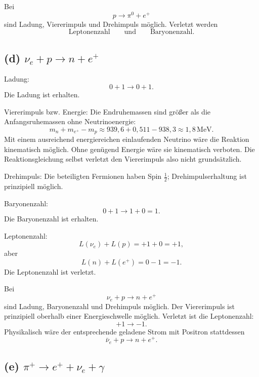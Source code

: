 \documentclass[11pt,a4paper]{scrartcl}
\begin{document}
\begin{answerbox}
Bei
\[
p\to\pi^0+e^+
\]
sind Ladung, Viererimpuls und Drehimpuls möglich. Verletzt werden
\[
\boxed{\text{Leptonenzahl}}
\qquad\text{und}\qquad
\boxed{\text{Baryonenzahl}}.
\]
\end{answerbox}

\subsection*{(d) $\nu_e+p\to n+e^+$}

\begin{calculationbox}
Ladung:
\[
0+1\to0+1.
\]
Die Ladung ist erhalten.

\begin{calculationbox}
Viererimpuls bzw. Energie: Die Endruhemassen sind größer als die Anfangsruhemassen ohne Neutrinoenergie:
\[
m_n+m_{e^+}-m_p\approx939{,}6+0{,}511-938{,}3
\approx1{,}8\,\mathrm{MeV}.
\]
Mit einem ausreichend energiereichen einlaufenden Neutrino wäre die Reaktion kinematisch möglich. Ohne genügend Energie wäre sie kinematisch verboten. Die Reaktionsgleichung selbst verletzt den Viererimpuls also nicht grundsätzlich.
\end{calculationbox}

\begin{calculationbox}
Drehimpuls: Die beteiligten Fermionen haben Spin $\frac12$; Drehimpulserhaltung ist prinzipiell möglich.

Baryonenzahl:
\[
0+1\to1+0=1.
\]
Die Baryonenzahl ist erhalten.

Leptonenzahl:
\[
L(\nu_e)+L(p)=+1+0=+1,
\]
aber
\[
L(n)+L(e^+)=0-1=-1.
\]
Die Leptonenzahl ist verletzt.
\end{calculationbox}
\end{calculationbox}

\begin{answerbox}
Bei
\[
\nu_e+p\to n+e^+
\]
sind Ladung, Baryonenzahl und Drehimpuls möglich. Der Viererimpuls ist prinzipiell oberhalb einer Energieschwelle möglich. Verletzt ist die Leptonenzahl:
\[
\boxed{+1\to -1}.
\]
Physikalisch wäre der entsprechende geladene Strom mit Positron stattdessen
\[
\bar\nu_e+p\to n+e^+.
\]
\end{answerbox}

\subsection*{(e) $\pi^+\to e^++\nu_e+\gamma$}
\end{document}

